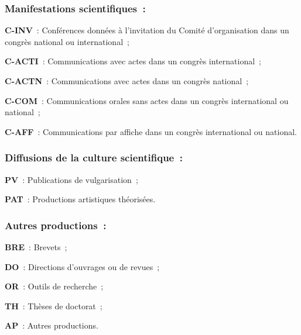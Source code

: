 \subsubsection*{Manifestations scientifiques~:}
    \begin{customitemize}
\item \textbf{C-INV}~: Conférences données à l'invitation du Comité d'organisation dans un congrès national ou international~;
\item \textbf{C-ACTI}~: Communications avec actes dans un congrès international~;
\item \textbf{C-ACTN}~: Communications avec actes dans un congrès national~;
\item \textbf{C-COM}~: Communications orales sans actes dans un congrès international ou national~;
\item \textbf{C-AFF}~: Communications par affiche dans un congrès international ou national.
    \end{customitemize}%

\subsubsection*{Diffusions de la culture scientifique~:}
    \begin{customitemize}
\item \textbf{PV}~: Publications de vulgarisation~;
\item \textbf{PAT}~: Productions artistiques théorisées.
    \end{customitemize}%

\subsubsection*{Autres productions~:}
    \begin{customitemize}
\item \textbf{BRE}~: Brevets~;
\item \textbf{DO}~: Directions d'ouvrages ou de revues~;
\item \textbf{OR}~: Outils de recherche~;
\item \textbf{TH}~: Thèses de doctorat~;
\item \textbf{AP}~: Autres productions.
    \end{customitemize}%

